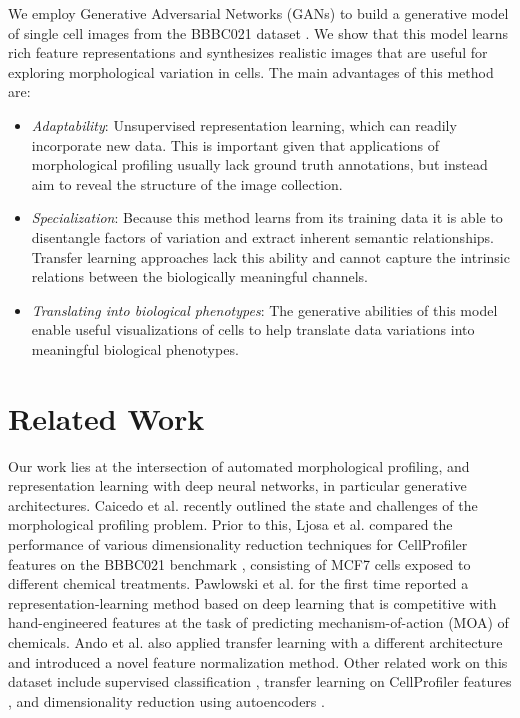 \documentclass{article}
\begin{document}
We employ Generative Adversarial Networks (GANs) \cite{goodfellow2014generative} to build a generative model of single cell images from the BBBC021 dataset \cite{Ljosa2012}. We show that this model learns rich feature representations and synthesizes realistic images that are useful for exploring morphological variation in cells. The main advantages of this method are:
\begin{itemize}
  \item \emph{Adaptability}: Unsupervised representation learning, which can readily incorporate new data. This is important given that applications of morphological profiling usually lack ground truth annotations, but instead aim to reveal the structure of the image collection.
  \item \emph{Specialization}: Because this method learns from its training data it is able to disentangle factors of variation and extract inherent semantic relationships. Transfer learning approaches lack this ability and cannot capture the intrinsic relations between the biologically meaningful channels.
  \item \emph{Translating into biological phenotypes}: The generative abilities of this model enable useful visualizations of cells to help translate data variations into meaningful biological phenotypes.
\end{itemize}

\section{Related Work}

Our work lies at the intersection of automated morphological profiling, and representation learning with deep neural networks, in particular generative architectures. Caicedo et al. \cite{caicedo2017data} recently outlined the state and challenges of the morphological profiling problem. Prior to this, Ljosa et al. \cite{Ljosa2013} compared the performance of various dimensionality reduction techniques for CellProfiler features on the BBBC021 benchmark \cite{Ljosa2012}, consisting of MCF7 cells exposed to different chemical treatments. Pawlowski et al. \cite{pawlowski2016automating} for the first time reported a representation-learning method based on deep learning that is competitive with hand-engineered features at the task of predicting mechanism-of-action (MOA) of chemicals. Ando et al. \cite{ando2017improving} also applied transfer learning with a different architecture and introduced a novel feature normalization method. Other related work on this dataset include supervised classification \cite{Kraus2016a}, transfer learning on CellProfiler features \cite{Kandaswamy2016}, and dimensionality reduction using autoencoders \cite{Zamparo2015}.
\end{document}
